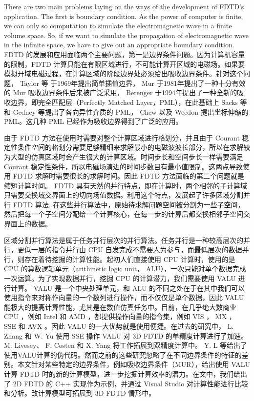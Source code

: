 There are two main problems laying on the ways of the development of FDTD's application. The first is boundary condition. As the power of computer is finite, we can only so computation to simulate the electromagnetic wave in a finite volume space. So, if we want to simulate the propagation of electromagnetic wave in the infinite space, we have to give out an appropriate boundary condition. 
FDTD 的发展和应用面临两个主要问题，第一是边界条件问题。因为计算机容量的限制，FDTD 计算只能在有限区域进行，不可能计算开区域的电磁场。如果要模拟开域电磁过程，在计算区域的阶段边界处必须给出吸收边界条件。针对这个问题， Taylor 等 \cite{taylor} 于1969年提出简单插值边界， Mur \cite{mur1981absorbing} 于1981年提出了一种十分有效的 Mur 吸收边界条件后来被广泛采用， Berenger \cite{berenger1994perfectly} 于1994年提出了一种全新的吸收边界，即完全匹配层（Perfectly Matched Layer，PML），在此基础上 Sacks \cite{sacks} 等和 Gedney \cite{gedney} 等提出了各向异性介质的 PML， Chew 以及 Weedon \cite{chew} 提出坐标伸缩的 PML。这几种 PML 已经作为吸收边界得到了广泛的应用。

由于 FDTD 方法在使用时需要对整个计算区域进行格划分，并且由于 Courant 稳定性条件空间的格划分需要足够精细来求解最小的电磁波波长部分，所以在求解较为大型的仿真区域时会产生很大的计算区域。时间步长和空间步长一样需要满足 Courant 稳定性条件，所以电磁场演进的时间步数目有最小值限制。这两点导致使用 FDTD 求解时需要很长的求解时间。因此 FDTD 方法面临的第二个问题就是缩短计算时间。 FDTD 具有天然的并行特点，即在计算时，两个相邻的子计算域只需要交换域交界面上的切向场值数据。利用这个特点，发展起了许多区域分割并行 FDTD 算法. 在这些并行算法中，原始待求解问题空间被分割为一些子空间，然后把每一个子空间分配给一个计算核心，在每一步的计算后都交换相邻子空间交界面上的数据。

区域分割并行算法是属于任务并行层次的并行算法。任务并行是一种较高层次的并行，更低一层的指令并行由 CPU 自发完成不需要人为参与，而最低层次的数据并行，则存在着待挖掘的计算性能。起初人们直接使用 CPU 计算时，使用的是 CPU 的算数逻辑单元（arithmetic logic unit， ALU），一次只能对单个数据完成一次运算。为了实现数据并行，挖掘 CPU 的计算潜力，我们需要使用 VALU 进行计算。 VALU 是一个中央处理单元，和 ALU 的不同之处在于在其中我们可以使用指令来对称作向量的一个数列进行操作，而不仅仅是单个数据，因此 VALU 能极大的提高计算性能，尤其是在数值仿真任务中。目前，在几乎绝大数商业 CPU ，例如 Intel 和 AMD ，都提供操作向量的指令集，例如 VIS ， MX ， SSE 和 AVX 。因此 VALU 的一大优势就是使用便捷。在过去的研究中， L. Zhang 和 W. Yu \cite{LZhangandWYu} 使用 SSE 操作 VALU 对 3D FDTD 的单精度计算进行了加速。 M. Livesey、 F. Costen 和 X. Yang \cite{Doubleprecision} 将工作拓展到双精度计算中。 Y. L \cite{AdvancedFDTDMethod} 等给出了使用VALU计算的伪代码。然而之前的这些研究忽略了在不同边界条件的特征的差别。本文针对某些特定的边界条件，例如吸收边界条件（MUR），给出使用 VALU 计算 FDTD 时的新的计算模型，进一步挖掘计算效率的潜力。在文中，我们给出了 2D FDTD 的 C++ 实现作为示例，并通过 Visual Studio 对计算性能进行比较和分析。改计算模型可拓展到 3D FDTD 情形中。

